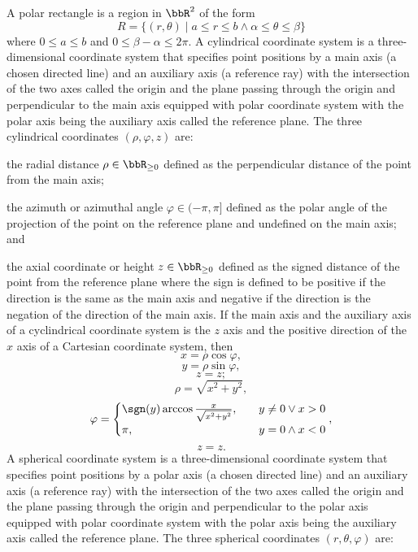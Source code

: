 A polar rectangle is a region in $\bbR^2$ of the form
\[R=\{(r,\theta)\mid a\le r\le b\land\alpha\le\theta\le\beta\}\]
where $0\le a\le b$ and $0\le\beta-\alpha\le 2\pi$.
A cylindrical coordinate system is a three-dimensional coordinate system that specifies point positions by a main axis (a chosen directed line) and an auxiliary axis (a reference ray) with the intersection of the two axes called the origin and the plane passing through the origin and perpendicular to the main axis equipped with polar coordinate system with the polar axis being the auxiliary axis called the reference plane. The three cylindrical coordinates $(\rho,\varphi,z)$ are:
\bit
\item the radial distance $\rho\in\bbR_{\geq 0}$ defined as the perpendicular distance of the point from the main axis;
\item the azimuth or azimuthal angle $\varphi\in(-\pi,\pi]$ defined as the polar angle of the projection of the point on the reference plane and undefined on the main axis; and
\item the axial coordinate or height $z\in\bbR_{\geq 0}$ defined as the signed distance of the point from the reference plane where the sign is defined to be positive if the direction is the same as the main axis and negative if the direction is the negation of the direction of the main axis.
\eit
{}
If the main axis and the auxiliary axis of a cyclindrical coordinate system is the $z$ axis and the positive direction of the $x$ axis of a Cartesian coordinate system, then
\[x=\rho\cos\varphi,\]
\[y=\rho\sin\varphi,\]
\[z=z;\]
\[\rho=\sqrt{x^2+y^2},\]
\[\varphi=\begin{cases}\sgn(y)\arccos\frac{x}{\sqrt{x^2+y^2}},\quad&y\neq 0\lor x>0\\\pi,\quad&y=0\land x<0\end{cases},\]
\[z=z.\]
A spherical coordinate system is a three-dimensional coordinate system that specifies point positions by a polar axis (a chosen directed line) and an auxiliary axis (a reference ray) with the intersection of the two axes called the origin and the plane passing through the origin and perpendicular to the polar axis equipped with polar coordinate system with the polar axis being the auxiliary axis called the reference plane. The three spherical coordinates $(r,\theta,\varphi)$ are:
\bit
